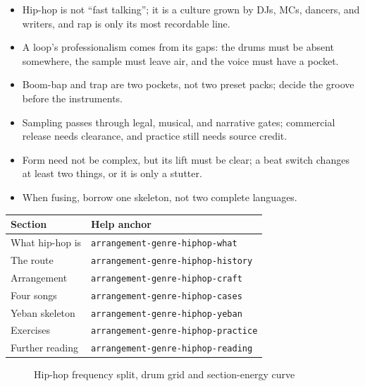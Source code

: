 \begin{itemize}
\item Hip-hop is not ``fast talking''; it is a culture grown by DJs, MCs, dancers, and writers, and rap is only its most recordable line.
\item A loop's professionalism comes from its gaps: the drums must be absent somewhere, the sample must leave air, and the voice must have a pocket.
\item Boom-bap and trap are two pockets, not two preset packs; decide the groove before the instruments.
\item Sampling passes through legal, musical, and narrative gates; commercial release needs clearance, and practice still needs source credit.
\item Form need not be complex, but its lift must be clear; a beat switch changes at least two things, or it is only a stutter.
\item When fusing, borrow one skeleton, not two complete languages.
\end{itemize}

\begin{helpmapping}
\begin{longtable}{p{}p{}}
\toprule
Section & Help anchor \\
\midrule
What hip-hop is & \texttt{arrangement-genre-hiphop-what} \\
The route & \texttt{arrangement-genre-hiphop-history} \\
Arrangement & \texttt{arrangement-genre-hiphop-craft} \\
Four songs & \texttt{arrangement-genre-hiphop-cases} \\
Yeban skeleton & \texttt{arrangement-genre-hiphop-yeban} \\
Exercises & \texttt{arrangement-genre-hiphop-practice} \\
Further reading & \texttt{arrangement-genre-hiphop-reading} \\
\bottomrule
\end{longtable}
\end{helpmapping}

\begin{figure}[htbp]\centering
{}
\caption{Hip-hop frequency split, drum grid and section-energy curve}
\end{figure}
